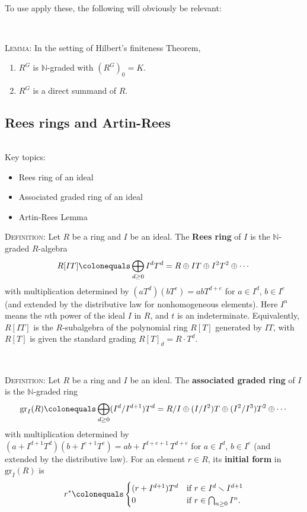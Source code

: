 \documentclass[12pt]{amsart}
\newcommand{\N}{\mathbb{N}}
\newcommand{\0}{$\phantom{.}$}
\newcommand{\1}{\mathbbm{1}}
\newcommand\ceq{\colonequals}
\begin{document}
\

\noindent To use apply these, the following will obviously be relevant:

\

\noindent \textsc{Lemma:} In the setting of Hilbert's finiteness Theorem,
\begin{enumerate}
\item $R^G$ is $\N$-graded with $(R^G)_0=K$.
\item $R^G$ is a direct summand of $R$.
\end{enumerate}



	
\newpage
\subsection{Rees rings and Artin-Rees} \0

\begin{framed} Key topics:
\begin{itemize}
\item Rees ring of an ideal
\item Associated graded ring of an ideal
\item Artin-Rees Lemma
\end{itemize}
\end{framed}


\noindent \textsc{Definition:} Let $R$ be a ring and $I$ be an ideal.
The \textbf{Rees ring} of $I$ is the $\N$-graded $R$-algebra
\[  R[IT] \ceq \bigoplus_{d\geq 0} I^d T^d = R \oplus I T \oplus I^2 T^2 \oplus \cdots \]
with multiplication determined by $(a T^d)(b T^e) = ab T^{d+e}$ for $a\in I^d$, $b\in I^e$ (and extended by the distributive law for nonhomogeneous elements). Here $I^n$ means the $n$th power of the ideal $I$ in $R$, and $t$ is an indeterminate. Equivalently, $R[IT]$ is the $R$-subalgebra of the polynomial ring $R[T]$ generated by $IT$, with $R[T]$ is given the standard grading $R[T]_d = R \cdot T^d$.

\

\noindent \textsc{Definition:} Let $R$ be a ring and $I$ be an ideal.
The \textbf{associated graded ring} of $I$ is the $\N$-graded ring
\[ \mathrm{gr}_I(R) \ceq \bigoplus_{d\geq 0} (I^d / I^{d+1}) T^d = R/I \oplus (I/I^2) T \oplus (I^2/I^3) T^2 \oplus \cdots \]
with multiplication determined by $(a+I^{d+1} T^d)(b + I^{e+1} T^e) = ab+I^{d+e+1} \, T^{d+e}$ for $a\in I^d$, $b\in I^e$ (and extended by the distributive law).
For an element $r\in R$, its \textbf{initial form} in $\mathrm{gr}_I(R)$ is
\[ r^* \ceq \begin{cases} (r+ I^{d+1})T^d &\text{if} \ r\in I^d \smallsetminus I^{d+1} \\ 0 &\text{if} \ r\in \bigcap_{n\geq 0} I^n.\end{cases}\]
\end{document}
